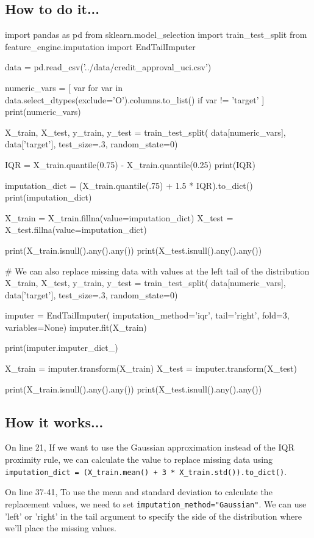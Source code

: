 \subsection{How to do it...}
\begin{pyc}
import pandas as pd
from sklearn.model_selection import train_test_split
from feature_engine.imputation import EndTailImputer

data = pd.read_csv('../data/credit_approval_uci.csv')

numeric_vars = [
    var for var in data.select_dtypes(exclude='O').columns.to_list() if var != 'target'
]
print(numeric_vars)

X_train, X_test, y_train, y_test = train_test_split(
    data[numeric_vars],
    data['target'],
    test_size=.3,
    random_state=0)

IQR = X_train.quantile(0.75) - X_train.quantile(0.25)
print(IQR)

imputation_dict = (X_train.quantile(.75) + 1.5 * IQR).to_dict()
print(imputation_dict)

X_train = X_train.fillna(value=imputation_dict)
X_test = X_test.fillna(value=imputation_dict)

print(X_train.isnull().any().any())
print(X_test.isnull().any().any())

# We can also replace missing data with values at the left tail of the distribution
X_train, X_test, y_train, y_test = train_test_split(
    data[numeric_vars],
    data['target'],
    test_size=.3,
    random_state=0)

imputer = EndTailImputer(
    imputation_method='iqr',
    tail='right',
    fold=3,
    variables=None)
imputer.fit(X_train)

print(imputer.imputer_dict_)

X_train = imputer.transform(X_train)
X_test = imputer.transform(X_test)

print(X_train.isnull().any().any())
print(X_test.isnull().any().any())
\end{pyc}
\subsection{How it works...}
On line 21, If we want to use the Gaussian approximation instead of the IQR proximity rule, we can calculate
the value to replace missing data using \verb|imputation_dict = (X_train.mean() + 3 * X_train.std()).to_dict()|.

On line 37-41, To use the mean and standard deviation to calculate the replacement values, we need to set
\verb|imputation_method="Gaussian"|. We can use 'left' or 'right' in the tail
argument to specify the side of the distribution where we'll place the missing values.

